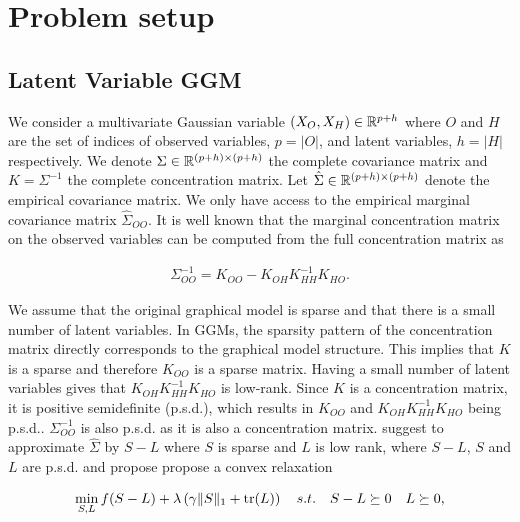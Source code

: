 \section{Problem setup}
\label{setup}

\subsection{Latent Variable GGM}
\label{sec:ggm}
We consider a multivariate Gaussian variable $(X_{O},X_{H})\in\mathbb{R}^{p+h}$ where $O$ and $H$ are the set of indices of observed variables, $p=|O|$, and latent variables, $h=|H|$ respectively. We denote $\Sigma\in\mathbb{R}^{(p+h)\times(p+h)}$ the complete covariance matrix and $K=\Sigma^{-1}$ the complete concentration matrix. Let $\hat{\Sigma}\in\mathbb{R}^{(p+h)\times(p+h)}$ denote the empirical covariance matrix. We only have access to the empirical marginal covariance matrix $\hat{\Sigma}_{OO}$. It is well known that the marginal concentration matrix on the observed variables can be computed from the full concentration matrix as

\begin{align}
\Sigma_{OO}^{-1} = K_{OO}-K_{OH}K_{HH}^{-1}K_{HO}.
\end{align}

We assume that the original graphical model is sparse and that there is a small number of latent variables. In GGMs, the sparsity pattern of the concentration matrix  directly corresponds to the graphical model structure. This implies that  $K$ is a sparse  and therefore $K_{OO}$ is a sparse matrix. Having a small number of latent variables gives that $K_{OH}K_{HH}^{-1}K_{HO}$ is low-rank. Since $K$ is a concentration matrix, it is positive semidefinite (p.s.d.), which results in  $K_{OO}$ and $K_{OH}K_{HH}^{-1}K_{HO}$ being p.s.d.. $\Sigma_{OO}^{-1}$ is also p.s.d. as it is also a concentration matrix. \citet{chandrasekaran2010} suggest to approximate $\hat{\Sigma}$  by $S-L$ where $S$ is sparse and $L$ is low rank, where $S-L$, $S$ and $L$ are p.s.d. and propose propose a convex relaxation 

\begin{align}
\label{opt_tr}
\min_{S,L} f(S-L)+\lambda\left(\gamma\|S\|_{1}+ {\rm tr}(L)\right) \quad s.t. \quad S-L \succeq 0 \quad L \succeq 0,
\end{align}

